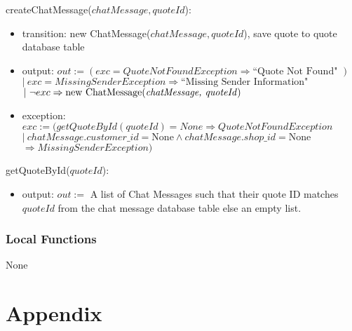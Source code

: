 \documentclass[12pt, titlepage]{article}
\begin{document}
\noindent createChatMessage($chatMessage, quoteId$):
\begin{itemize}
	\item transition: new ChatMessage($chatMessage, quoteId$), save quote to quote database table
	\item output: $out := (exc = QuoteNotFoundException \Rightarrow \text{``Quote Not Found" })$ \\ $|\ exc =
		      MissingSenderException \Rightarrow \text{``Missing Sender Information" }$ \\ $|\ \neg exc
		      \Rightarrow \text{new ChatMessage(\emph{chatMessage, quoteId})}$
	\item exception: $exc := (getQuoteById(quoteId) = None \Rightarrow QuoteNotFoundException$ \\ $ |\
		      chatMessage.customer\_id = \text{None} \land chatMessage.shop\_id = \text{None}$ \\ $\Rightarrow
		      MissingSenderException)$
\end{itemize}

\noindent getQuoteById($quoteId$):
\begin{itemize}
	\item output: $out :=$ A list of Chat Messages such that their quote ID matches $quoteId$ from the chat
	      message database table else an empty list.
\end{itemize}

\subsubsection{Local Functions}

None

\newpage




\newpage

\section{Appendix}

\end{document}
